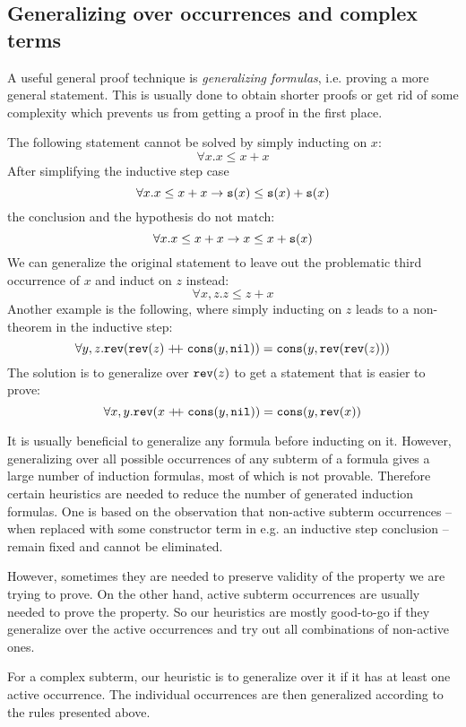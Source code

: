 \subsection{Generalizing over occurrences and complex terms}
A useful general proof technique is \textit{generalizing formulas}, i.e. proving a more general statement. This is usually done to obtain shorter proofs or get rid of some complexity which prevents us from getting a proof in the first place.
\begin{example}
	The following statement cannot be solved by simply inducting on $x$:
	$$\forall x. x\leq x + x$$
	After simplifying the inductive step case
	$$\forall x. x\leq x + x \rightarrow \mathtt{s}(x)\leq\mathtt{s}(x)+\mathtt{s}(x)$$
	the conclusion and the hypothesis do not match:
	$$\forall x. x\leq x + x \rightarrow x\leq x+\mathtt{s}(x)$$
	We can generalize the original statement to leave out the problematic third occurrence of $x$ and induct on $z$ instead:
	$$\forall x,z. z\leq z + x$$
	Another example is the following, where simply inducting on $z$ leads to a non-theorem in the inductive step:
	$$\forall y,z.\mathtt{rev}(\mathtt{rev}(z)\mathrel{ +\hspace{-1mm}+ }\mathtt{cons}(y, \mathtt{nil})) = \mathtt{cons}(y,\mathtt{rev}(\mathtt{rev}(z)))$$
	The solution is to generalize over $\mathtt{rev}(z)$ to get a statement that is easier to prove:
	$$\forall x,y.\mathtt{rev}(x\mathrel{ +\hspace{-1mm}+ }\mathtt{cons}(y, \mathtt{nil})) = \mathtt{cons}(y,\mathtt{rev}(x))$$
\end{example}
It is usually beneficial to generalize any formula before inducting on it. However, generalizing over all possible occurrences of any subterm of a formula gives a large number of induction formulas, most of which is not provable. Therefore certain heuristics are needed to reduce the number of generated induction formulas. One is based on the observation that non-active subterm occurrences -- when replaced with some constructor term in e.g. an inductive step conclusion -- remain fixed and cannot be eliminated.

However, sometimes they are needed to preserve validity of the property we are trying to prove. On the other hand, active subterm occurrences are usually needed to prove the property. So our heuristics are mostly good-to-go if they generalize over the active occurrences and try out all combinations of non-active ones.

For a complex subterm, our heuristic is to generalize over it if it has at least one active occurrence. The individual occurrences are then generalized according to the rules presented above.